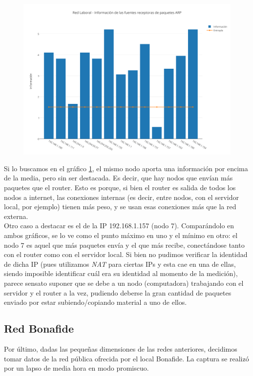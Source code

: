 \begin{figure}[h!]
    \centering                                                       
    \includegraphics[width=400pt]{img/RedLaboralFuentesReceptorasARP}
    \caption{}
    \label{laboralReceptoras}
\end{figure}

Si lo buscamos en el gr\'afico \ref{laboralReceptoras}, el mismo nodo aporta una informaci\'on por encima de la media, pero sin ser destacada. Es decir, que hay nodos que env\'ian m\'as paquetes que el router. Esto es porque, si bien el router es salida de todos los nodos a internet, las conexiones internas (es decir, entre nodos, con el servidor local, por ejemplo) tienen m\'as peso, y se usan esas conexiones m\'as que la red externa.\\

Otro caso a destacar es el de la IP 192.168.1.157 (nodo 7). Compar\'andolo en ambos gr\'aficos, se lo ve como el punto m\'aximo en uno y el m\'inimo en otro: el nodo 7 es aquel que m\'as paquetes env\'ia y el que m\'as recibe, conect\'andose tanto con el router como con el servidor local. Si bien no pudimos verificar la identidad de dicha IP (pues utilizamos \textit{NAT} para ciertas IPs y esta cae en una de ellas, siendo imposible identificar cu\'al era su identidad al momento de la medici\'on), parece sensato suponer que se debe a un nodo (computadora) trabajando con el servidor y el router a la vez, pudiendo deberse la gran cantidad de paquetes enviado por estar subiendo/copiando material a uno de ellos.\\

\newpage
\subsection{Red Bonafide}
 Por \'ultimo, dadas las peque\~nas dimensiones de las redes anteriores, decidimos tomar datos de la red p\'ublica ofrecida por el local Bonafide. La captura se realiz\'o por un lapso de media hora en modo promiscuo.

